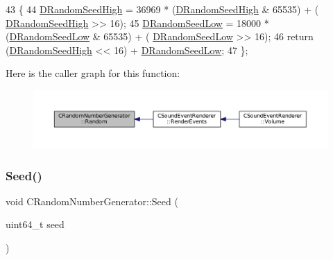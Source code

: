 \begin{DoxyCode}
43                          \{
44             \hyperlink{classCRandomNumberGenerator_a450670f954d6ccb3cc39d7eebbf889c6}{DRandomSeedHigh} = 36969 * (\hyperlink{classCRandomNumberGenerator_a450670f954d6ccb3cc39d7eebbf889c6}{DRandomSeedHigh} & 65535) + (
      \hyperlink{classCRandomNumberGenerator_a450670f954d6ccb3cc39d7eebbf889c6}{DRandomSeedHigh} >> 16);
45             \hyperlink{classCRandomNumberGenerator_a33bf3bb9bc1378f4142932a01a3e2cfd}{DRandomSeedLow} = 18000 * (\hyperlink{classCRandomNumberGenerator_a33bf3bb9bc1378f4142932a01a3e2cfd}{DRandomSeedLow} & 65535) + (
      \hyperlink{classCRandomNumberGenerator_a33bf3bb9bc1378f4142932a01a3e2cfd}{DRandomSeedLow} >> 16);
46             \textcolor{keywordflow}{return} (\hyperlink{classCRandomNumberGenerator_a450670f954d6ccb3cc39d7eebbf889c6}{DRandomSeedHigh} << 16) + \hyperlink{classCRandomNumberGenerator_a33bf3bb9bc1378f4142932a01a3e2cfd}{DRandomSeedLow};
47         \};
\end{DoxyCode}
Here is the caller graph for this function\+:\nopagebreak
\begin{figure}[H]
\begin{center}
\leavevmode
\includegraphics[width=350pt]{classCRandomNumberGenerator_aa7fc51bde5647d15df2f1b9826702ca2_icgraph}
\end{center}
\end{figure}
\hypertarget{classCRandomNumberGenerator_a9b6f52335ea93f1aaec4521c66806f39}{}\label{classCRandomNumberGenerator_a9b6f52335ea93f1aaec4521c66806f39} 
\subsubsection{\texorpdfstring{Seed()}{Seed()}\hspace{0.1cm}{\footnotesize\ttfamily [1/2]}}
{\footnotesize\ttfamily void C\+Random\+Number\+Generator\+::\+Seed (\begin{DoxyParamCaption}\item[{uint64\+\_\+t}]{seed }\end{DoxyParamCaption})\hspace{0.3cm}{\ttfamily [inline]}}




